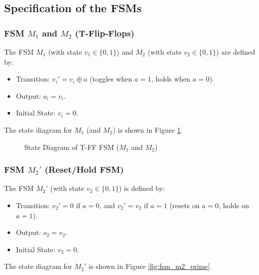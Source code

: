 \documentclass[12pt,a4paper]{article}
\begin{document}
\subsection{Specification of the FSMs}

\subsubsection{FSM $M_1$ and $M_2$ (T-Flip-Flops)}
The FSM $M_1$ (with state $v_1 \in \{0, 1\}$) and $M_2$ (with state $v_2 \in \{0, 1\}$) are defined by:
\begin{itemize}
    \item Transition: $v_i' = v_i \oplus a$ (toggles when $a=1$, holds when $a=0$).
    \item Output: $o_i = v_i$.
    \item Initial State: $v_i = 0$.
\end{itemize}

The state diagram for $M_1$ (and $M_2$) is shown in Figure \ref{fig:fsm_m1}.

\begin{figure}[h!]
    \centering
    \caption{State Diagram of T-FF FSM ($M_1$ and $M_2$)}
    \label{fig:fsm_m1}
\end{figure}

\subsubsection{FSM $M_2'$ (Reset/Hold FSM)}
The FSM $M_2'$ (with state $v_2 \in \{0, 1\}$) is defined by:
\begin{itemize}
    \item Transition: $v_2' = 0$ if $a=0$, and $v_2' = v_2$ if $a=1$ (resets on $a=0$, holds on $a=1$).
    \item Output: $o_2 = v_2$.
    \item Initial State: $v_2 = 0$.
\end{itemize}

The state diagram for $M_2'$ is shown in Figure \ref{fig:fsm_m2_prime}.
\end{document}

